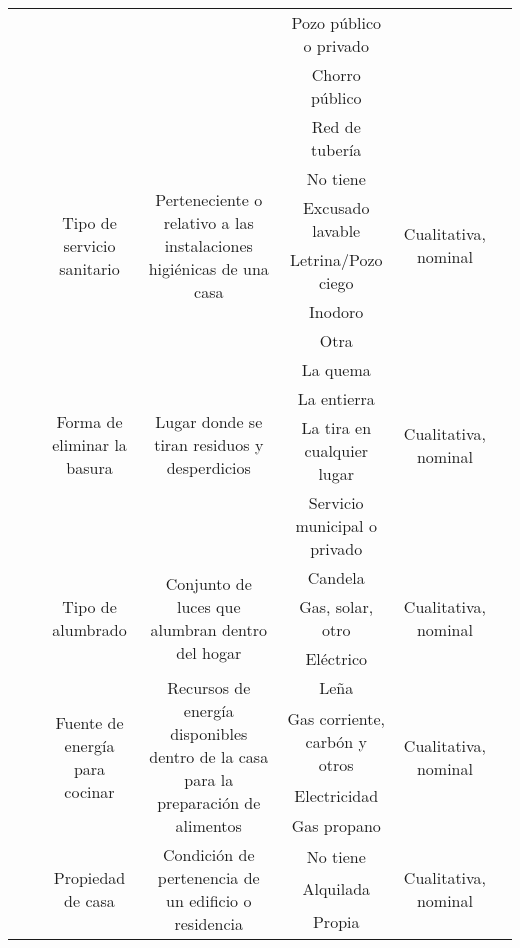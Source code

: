 \documentclass[11pt,letterpaper]{report}
\begin{document}
\begin{landscape}
\begin{longtable}{|c|c|c|c|c|c|c|}
 &  &  &  & Pozo público o privado &  &  \\ \cline{5-5}
 &  &  &  & Chorro público &  &  \\ \cline{5-5}
 &  &  &  & Red de tubería &  &  \\ \cline{3-6}
 &  & \multirow{4}{*}{Tipo de servicio sanitario} & \multirow{4}{*}{Perteneciente o relativo a las instalaciones higiénicas de una casa} & No tiene & \multirow{4}{*}{Cualitativa, nominal} &  \\ \cline{5-5}
 &  &  &  & Excusado lavable &  &  \\ \cline{5-5}
 &  &  &  & Letrina/Pozo ciego &  &  \\ \cline{5-5}
 &  &  &  & Inodoro &  &  \\ \cline{3-6}
 &  & \multirow{5}{*}{Forma de eliminar la basura} & \multirow{5}{*}{Lugar donde se tiran residuos y desperdicios} & Otra & \multirow{5}{*}{Cualitativa, nominal} &  \\ \cline{5-5}
 &  &  &  & La quema &  &  \\ \cline{5-5}
 &  &  &  & La entierra &  &  \\ \cline{5-5}
 &  &  &  & La tira en cualquier lugar &  &  \\ \cline{5-5}
 &  &  &  & Servicio municipal o privado &  &  \\ \cline{3-6}
 &  & \multirow{3}{*}{Tipo de alumbrado} & \multirow{3}{*}{Conjunto de luces que alumbran dentro del hogar} & Candela & \multirow{3}{*}{Cualitativa, nominal} &  \\ \cline{5-5}
 &  &  &  & Gas, solar, otro &  &  \\ \cline{5-5}
 &  &  &  & Eléctrico &  &  \\ \cline{3-6}
 &  & \multirow{4}{*}{Fuente de energía para cocinar} & \multirow{4}{*}{Recursos de energía disponibles dentro de la casa para la preparación de alimentos} & Leña & \multirow{4}{*}{Cualitativa, nominal} &  \\ \cline{5-5}
 &  &  &  & Gas corriente, carbón y otros &  &  \\ \cline{5-5}
 &  &  &  & Electricidad &  &  \\ \cline{5-5}
 &  &  &  & Gas propano &  &  \\ \cline{3-6}
 &  & \multirow{3}{*}{Propiedad de casa} & \multirow{3}{*}{Condición de pertenencia de un edificio o residencia} & No tiene & \multirow{3}{*}{Cualitativa, nominal} &  \\ \cline{5-5}
 &  &  &  & Alquilada &  &  \\ \cline{5-5}
 &  &  &  & Propia &  &  \\ \cline{2-6}

\end{longtable}
\end{landscape}
\end{document}
